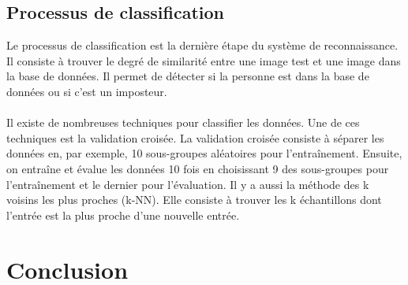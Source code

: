 \documentclass[12pt,twoside,letterpaper]{article}
\begin{document}
\subsection{Processus de classification}
Le processus de classification est la dernière étape du système de reconnaissance. Il consiste à trouver le degré de similarité entre une image test et une image dans la base de données. Il permet de détecter si la personne est dans la base de données ou si c’est un imposteur.\cite{ref_01}\cite{ref_06}
\\~\\
Il existe de nombreuses techniques pour classifier les données. Une de ces techniques est la validation croisée. La validation croisée consiste à séparer les données en, par exemple, 10 sous-groupes aléatoires pour l'entraînement. Ensuite, on entraîne et évalue les données 10 fois en choisissant 9 des sous-groupes pour l'entraînement et le dernier pour l'évaluation.\cite{ref_03} Il y a aussi la méthode des k voisins les plus proches (k-NN). Elle consiste à trouver les k échantillons dont l'entrée est la plus proche d'une nouvelle entrée.

\section{Conclusion}

\newpage

\end{document}
